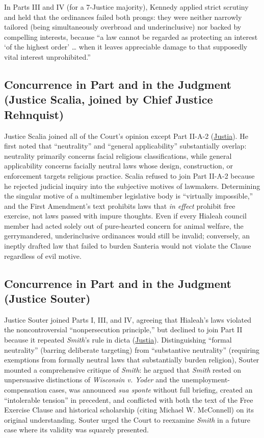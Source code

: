 \documentclass[12pt]{article}
\begin{document}
In Parts III and IV (for a 7-Justice majority), Kennedy applied strict scrutiny and held that the ordinances failed both prongs: they were neither narrowly tailored (being simultaneously overbroad and underinclusive) nor backed by compelling interests, because ``a law cannot be regarded as protecting an interest `of the highest order' \dots{} when it leaves appreciable damage to that supposedly vital interest unprohibited.''

\subsection{Concurrence in Part and in the Judgment (Justice Scalia, joined by Chief Justice Rehnquist)}

Justice Scalia joined all of the Court's opinion except Part II-A-2 (\href{https://supreme.justia.com/cases/federal/us/508/520/}{Justia}). He first noted that ``neutrality'' and ``general applicability'' substantially overlap: neutrality primarily concerns facial religious classifications, while general applicability concerns facially neutral laws whose design, construction, or enforcement targets religious practice. Scalia refused to join Part II-A-2 because he rejected judicial inquiry into the subjective motives of lawmakers. Determining the singular motive of a multimember legislative body is ``virtually impossible,'' and the First Amendment's text prohibits laws that \textit{in effect} prohibit free exercise, not laws passed with impure thoughts. Even if every Hialeah council member had acted solely out of pure-hearted concern for animal welfare, the gerrymandered, underinclusive ordinances would still be invalid; conversely, an ineptly drafted law that failed to burden Santeria would not violate the Clause regardless of evil motive.

\subsection{Concurrence in Part and in the Judgment (Justice Souter)}

Justice Souter joined Parts I, III, and IV, agreeing that Hialeah's laws violated the noncontroversial ``nonpersecution principle,'' but declined to join Part II because it repeated \textit{Smith}'s rule in dicta (\href{https://supreme.justia.com/cases/federal/us/508/520/}{Justia}). Distinguishing ``formal neutrality'' (barring deliberate targeting) from ``substantive neutrality'' (requiring exemptions from formally neutral laws that substantially burden religion), Souter mounted a comprehensive critique of \textit{Smith}: he argued that \textit{Smith} rested on unpersuasive distinctions of \textit{Wisconsin v. Yoder} and the unemployment-compensation cases, was announced \textit{sua sponte} without full briefing, created an ``intolerable tension'' in precedent, and conflicted with both the text of the Free Exercise Clause and historical scholarship (citing Michael W. McConnell) on its original understanding. Souter urged the Court to reexamine \textit{Smith} in a future case where its validity was squarely presented.
\end{document}
